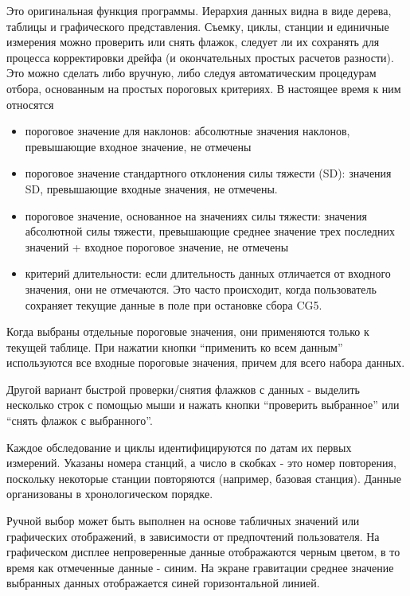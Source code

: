 Это оригинальная функция программы. Иерархия данных видна в виде дерева, таблицы
и графического представления. Съемку, циклы, станции и единичные измерения можно
проверить или снять флажок, следует ли их сохранять для процесса корректировки
дрейфа (и окончательных простых расчетов разности). Это можно сделать либо
вручную, либо следуя автоматическим процедурам отбора, основанным на простых
пороговых критериях. В настоящее время к ним относятся 
\begin{itemize}
    \item пороговое значение для наклонов: абсолютные значения наклонов,
    превышающие входное значение, не отмечены
    
    \item пороговое значение стандартного отклонения силы тяжести (SD): значения
    SD, превышающие входные значения, не отмечены.

    \item пороговое значение, основанное на значениях силы тяжести: значения
    абсолютной силы тяжести, превышающие среднее значение трех последних
    значений + входное пороговое значение, не отмечены

    \item критерий длительности: если длительность данных отличается от входного
    значения, они не отмечаются. Это часто происходит, когда пользователь
    сохраняет текущие данные в поле при остановке сбора CG5.

\end{itemize}

Когда выбраны отдельные пороговые значения, они применяются только к текущей
таблице. При нажатии кнопки “применить ко всем данным” используются все входные
пороговые значения, причем для всего набора данных.

Другой вариант быстрой проверки/снятия флажков с данных - выделить несколько
строк с помощью мыши и нажать кнопки “проверить выбранное” или “снять флажок с
выбранного”.

Каждое обследование и циклы идентифицируются по датам их первых измерений.
Указаны номера станций, а число в скобках - это номер повторения, поскольку
некоторые станции повторяются (например, базовая станция). Данные организованы в
хронологическом порядке.

Ручной выбор может быть выполнен на основе табличных значений или графических
отображений, в зависимости от предпочтений пользователя. На графическом дисплее
непроверенные данные отображаются черным цветом, в то время как отмеченные
данные - синим. На экране гравитации среднее значение выбранных данных
отображается синей горизонтальной линией.

